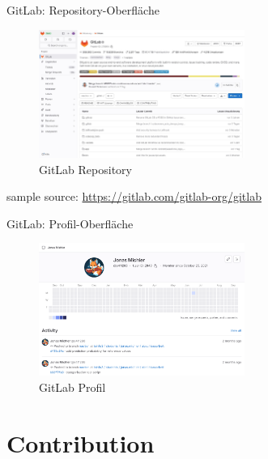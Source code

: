 \documentclass[compress,aspectratio=169]{beamer}
\begin{document}
	\begin{frame}{GitLab: Repository-Oberfläche}
		\begin{figure}
			\includegraphics[width=0.6\textwidth]{assets/gitlab/repository.jpg}
			\caption{GitLab Repository}
		\end{figure}
		sample source: \url{https://gitlab.com/gitlab-org/gitlab}
	\end{frame}
	
	\begin{frame}{GitLab: Profil-Oberfläche}
		\begin{figure}
			\includegraphics[width=0.6\textwidth]{assets/gitlab/profile.png}
			\caption{GitLab Profil}
		\end{figure}
	\end{frame}


	\section{Contribution}
\end{document}
